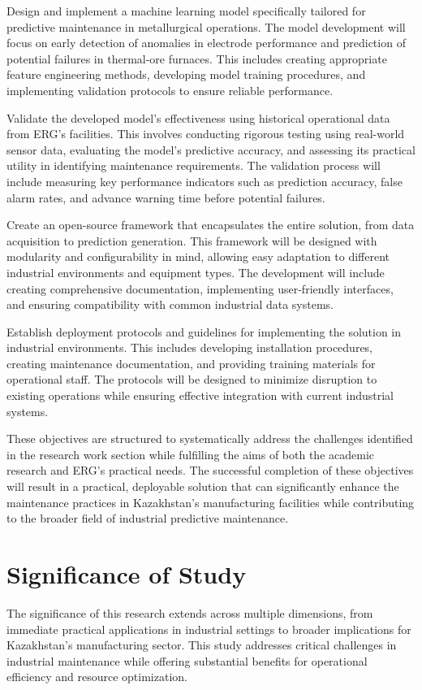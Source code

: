 Design and implement a machine learning model specifically tailored for predictive maintenance in metallurgical operations. The model development will focus on early detection of anomalies in electrode performance and prediction of potential failures in thermal-ore furnaces. This includes creating appropriate feature engineering methods, developing model training procedures, and implementing validation protocols to ensure reliable performance.

Validate the developed model's effectiveness using historical operational data from ERG's facilities. This involves conducting rigorous testing using real-world sensor data, evaluating the model's predictive accuracy, and assessing its practical utility in identifying maintenance requirements. The validation process will include measuring key performance indicators such as prediction accuracy, false alarm rates, and advance warning time before potential failures.

Create an open-source framework that encapsulates the entire solution, from data acquisition to prediction generation. This framework will be designed with modularity and configurability in mind, allowing easy adaptation to different industrial environments and equipment types. The development will include creating comprehensive documentation, implementing user-friendly interfaces, and ensuring compatibility with common industrial data systems.

Establish deployment protocols and guidelines for implementing the solution in industrial environments. This includes developing installation procedures, creating maintenance documentation, and providing training materials for operational staff. The protocols will be designed to minimize disruption to existing operations while ensuring effective integration with current industrial systems.

These objectives are structured to systematically address the challenges identified in the research work section while fulfilling the aims of both the academic research and ERG's practical needs. The successful completion of these objectives will result in a practical, deployable solution that can significantly enhance the maintenance practices in Kazakhstan's manufacturing facilities while contributing to the broader field of industrial predictive maintenance.

\section{Significance of Study}
The significance of this research extends across multiple dimensions, from immediate practical applications in industrial settings to broader implications for Kazakhstan's manufacturing sector. This study addresses critical challenges in industrial maintenance while offering substantial benefits for operational efficiency and resource optimization.


